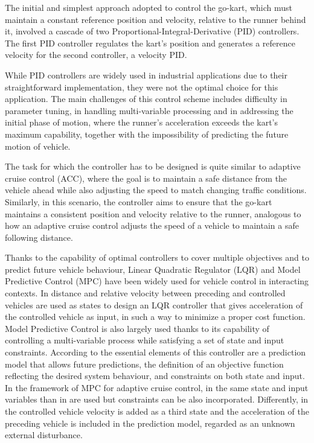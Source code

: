 \documentclass[a4paper,12pt,oneside]{book}
\begin{document}
\bigskip
The initial and simplest approach adopted to control the go-kart, which must maintain a constant reference position and velocity, relative to the runner behind it, involved a cascade of two Proportional-Integral-Derivative (PID) controllers.
The first PID controller regulates the kart's position and generates a reference velocity for the second controller, a velocity PID.

While PID controllers are widely used in industrial applications due to their straightforward implementation, they were not the optimal choice for this application.
The main challenges of this control scheme includes difficulty in parameter tuning, in handling multi-variable processing and in addressing the initial phase of motion, where the runner's acceleration exceeds the kart's maximum capability, together with the impossibility of predicting the future motion of vehicle. 

\bigskip
The task for which the controller has to be designed is quite similar to adaptive cruise control (ACC), where the goal is to maintain a safe distance from the vehicle ahead while also adjusting the speed to match changing traffic conditions.
Similarly, in this scenario, the controller aims to ensure that the go-kart maintains a consistent position and velocity relative to the runner, analogous to how an adaptive cruise control adjusts the speed of a vehicle to maintain a safe following distance.

\bigskip
Thanks to the capability of optimal controllers to cover multiple objectives and to predict future vehicle behaviour, Linear Quadratic Regulator (LQR) and Model Predictive Control (MPC) have been widely used for vehicle control in interacting contexts.
In \cite{LQR_acc} distance and relative velocity between preceding and controlled vehicles are used as states to design an LQR controller that gives acceleration of the controlled vehicle as input, in such a way to minimize a proper cost function.
Model Predictive Control is also largely used thanks to its capability of controlling a multi-variable process while satisfying a set of state and input constraints. According to \cite{MPC_basics} the essential elements of this controller are a prediction model that allows future predictions, the definition of an objective function reflecting the desired system behaviour, and constraints on both state and input. In the framework of MPC for adaptive cruise control, in \cite{MPC_acc_first} the same state and input variables than in \cite{LQR_acc} are used but constraints can be also incorporated. Differently, in \cite{MPC_acc_second} the controlled vehicle velocity is added as a third state and the acceleration of the preceding vehicle is included in the prediction model, regarded as an unknown external disturbance.
\end{document}
